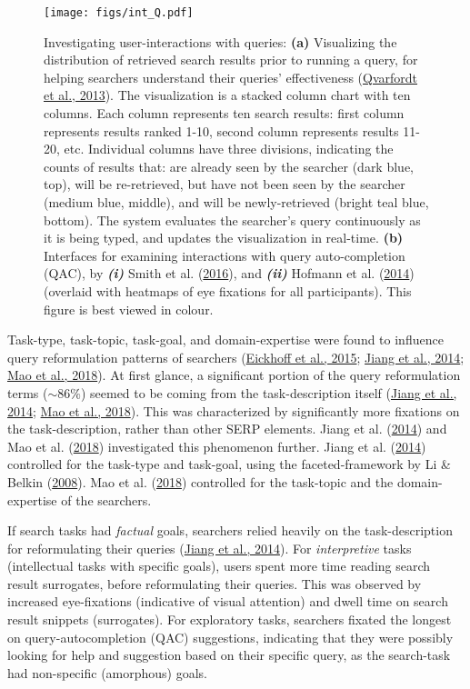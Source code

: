 \documentclass[a4paper, nobind]{templates/ociamthesis}
\begin{document}
\begin{figure}
\hypertarget{fig_int_Q}{%
\centering
\texttt{[image: figs/int\_Q.pdf]}
\caption{Investigating user-interactions with queries: \textbf{(a)} Visualizing the
distribution of retrieved search results prior to running a query, for
helping searchers understand their queries' effectiveness (\protect\hyperlink{ref-121}{Qvarfordt et al., 2013}). The
visualization is a stacked column chart with ten columns. Each column
represents ten search results: first column represents results ranked
1-10, second column represents results 11-20, etc. Individual columns
have three divisions, indicating the counts of results that: are already
seen by the searcher (dark blue, top), will be re-retrieved, but have
not been seen by the searcher (medium blue, middle), and will be
newly-retrieved (bright teal blue, bottom). The system evaluates the
searcher's query continuously as it is being typed, and updates the
visualization in real-time. \textbf{(b)} Interfaces for examining
interactions with query auto-completion (QAC), by \textbf{\emph{(i)}} Smith et al. (\protect\hyperlink{ref-129}{2016}), and
\textbf{\emph{(ii)}} Hofmann et al. (\protect\hyperlink{ref-125}{2014}) (overlaid with heatmaps of eye fixations for all
participants). This figure is best viewed in colour.}\label{fig_int_Q}
}
\end{figure}

Task-type, task-topic, task-goal, and domain-expertise were found to
influence query reformulation patterns of searchers (\protect\hyperlink{ref-127}{Eickhoff et al., 2015}; \protect\hyperlink{ref-126}{Jiang et al., 2014}; \protect\hyperlink{ref-133}{Mao et al., 2018}).
At first glance, a significant portion of the query reformulation terms
(\(\sim86\%\)) seemed to be coming from the task-description itself
(\protect\hyperlink{ref-126}{Jiang et al., 2014}; \protect\hyperlink{ref-133}{Mao et al., 2018}). This was characterized by significantly more fixations on
the task-description, rather than other SERP elements. Jiang et al. (\protect\hyperlink{ref-126}{2014}) and Mao et al. (\protect\hyperlink{ref-133}{2018})
investigated this phenomenon further. Jiang et al. (\protect\hyperlink{ref-126}{2014}) controlled for the task-type
and task-goal, using the faceted-framework by Li \& Belkin (\protect\hyperlink{ref-li2008faceted}{2008}). Mao et al. (\protect\hyperlink{ref-133}{2018})
controlled for the task-topic and the domain-expertise of the searchers.

If search tasks had \emph{factual} goals, searchers relied heavily on the
task-description for reformulating their queries (\protect\hyperlink{ref-126}{Jiang et al., 2014}). For
\emph{interpretive} tasks (intellectual tasks with specific goals), users
spent more time reading search result surrogates, before reformulating
their queries. This was observed by increased eye-fixations (indicative
of visual attention) and dwell time on search result snippets
(surrogates). For exploratory tasks, searchers fixated the longest on
query-autocompletion (QAC) suggestions, indicating that they were
possibly looking for help and suggestion based on their specific query,
as the search-task had non-specific (amorphous) goals.
\end{document}
